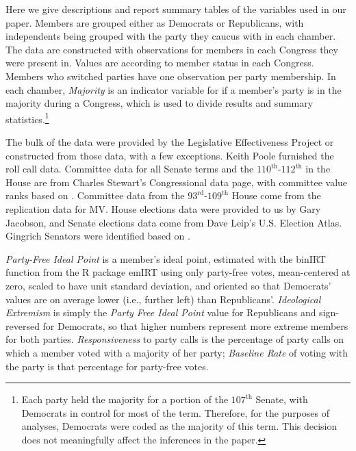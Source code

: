 \documentclass[12pt]{article}
\begin{document}
Here we give descriptions and report summary tables of the variables used in
our paper.
Members are grouped either as Democrats or Republicans, with independents being
grouped with the party they caucus with in each chamber.
The data are constructed with observations for members in each Congress they
were present in.
Values are according to member status in each Congress.
Members who switched parties have one observation per party membership.
In each chamber, \textit{Majority} is an indicator variable for if a member's
party is in the majority during a Congress, which is used to divide results and
summary statistics.\footnote{
  \doublespacing\normalsize
  Each party held the majority for a portion of the $107^{\text{th}}$ Senate,
  with Democrats in control for most of the term.
  Therefore, for the purposes of analyses, Democrats were coded as the majority
  of this term.
  This decision does not meaningfully affect the inferences in the paper.}

The bulk of the data were provided by the Legislative Effectiveness Project
\citep{Volden:2014} or constructed from those data, with a few exceptions.
Keith Poole furnished the roll call data.
Committee data for all Senate terms and the $110^{\text{th}}$-$112^{\text{th}}$
in the House are from Charles Stewart's Congressional data page, with committee
value ranks based on \cite{Groseclose:1998}.
Committee data from the $93^{\text{rd}}$-$109^{\text{th}}$ House come from the
replication data for MV.
House elections data were provided to us by Gary Jacobson, and Senate elections
data come from Dave Leip's U.S. Election Atlas.
Gingrich Senators were identified based on \cite{Theriault:2013}.

\textit{Party-Free Ideal Point} is a member's ideal point, estimated with the
\textsf{binIRT} function from the \textsf{R} package \textsf{emIRT} using only
party-free votes, mean-centered at zero, scaled to have unit standard deviation,
and oriented so that Democrats' values are on average lower (i.e., further left)
than Republicans'.
\textit{Ideological Extremism} is simply the \textit{Party Free Ideal Point}
value for Republicans and sign-reversed for Democrats, so that higher numbers
represent more extreme members for both parties. \textit{Responsiveness} to
party calls is the percentage of party calls on which a member voted with a
majority of her party; \textit{Baseline Rate}  of voting with the party is that
percentage for party-free votes.
\end{document}
